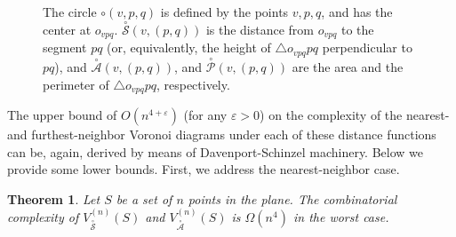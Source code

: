 \documentclass[10pt, conference, compsocconf]{IEEEtran}
\newtheorem{theorem}{Theorem}
\def\XA{{\stackrel{\circ}{\mathcal A}}}
\def\XP{{\stackrel{\circ}{\mathcal P}}}
\def\XS{{\stackrel{\circ}{\mathcal S}}}
\newcommand{\eps}{\varepsilon}
\begin{document}
   \begin{figure}
\centering
{}
      \caption{The circle $\circ(v,p,q)$ is defined by the points $v,p,q$,
               and has the center at $o_{vpq}$.  $\XS(v,(p,q))$ is the
               distance from $o_{vpq}$ to the segment $pq$ (or,
               equivalently, the height of $\triangle o_{vpq}pq$
               perpendicular to $pq$), and $\XA(v,(p,q))$, and
               $\XP(v,(p,q))$ are the area and the perimeter of $\triangle
               o_{vpq}pq$, respectively.}
      \label{fig:circ-based}
   \end{figure}

The upper bound of $O(n^{4+\eps})$ (for any $\eps > 0$) on the complexity of
the nearest- and furthest-neighbor Voronoi diagrams under each of these
distance functions can be, again, derived by means of Davenport-Schinzel
machinery.  Below we provide some lower bounds.  First, we address the
nearest-neighbor case.

\begin{theorem}
   Let $S$ be a set of $n$ points in the plane.
   The combinatorial complexity of $V_\XS^{(n)}(S)$ and $V_\XA^{(n)}(S)$
   is $\Omega(n^4)$ in the worst case.
\end{theorem}
\end{document}
